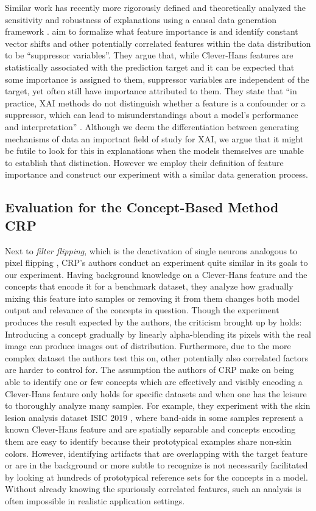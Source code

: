 Similar work has recently more rigorously defined and theoretically analyzed the sensitivity and robustness of explanations using a causal data generation framework \citep{Wilming2023,Wilming2022, Clark2023}. \cite{Wilming2022} aim to formalize what feature importance is and identify constant vector shifts and other potentially correlated features within the data distribution to be ``suppressor variables''.
They argue that, while Clever-Hans features are statistically associated with the prediction target and it can be expected that some importance is assigned to them, suppressor variables are independent of the target, yet often still have importance attributed to them. They state that ``in practice, XAI methods do not distinguish whether a feature is a confounder or a suppressor, which can lead to misunderstandings about a model's performance and interpretation'' \citep{Wilming2023}. Although we deem the differentiation between generating mechanisms of data an important field of study for XAI, we argue that it might be futile to look for this in explanations when the models themselves are unable to establish that distinction. 
However we employ their definition of feature importance and construct our experiment with a similar data generation process.

\subsection{Evaluation for the Concept-Based Method CRP}
Next to \textit{filter flipping}, which is the deactivation of single neurons analogous to pixel flipping \citep{Samek2017a}, CRP's authors conduct an experiment quite similar in its goals to our experiment. 
Having background knowledge on a Clever-Hans feature and the concepts that encode it for a benchmark dataset, they analyze how gradually mixing this feature into samples or removing it from them changes both model output and relevance of the concepts in question. 
Though the experiment produces the result expected by the authors, the criticism brought up by \cite{Hooker2019} holds: Introducing a concept gradually by linearly alpha-blending its pixels with the real image can produce images out of distribution. Furthermore, due to the more complex dataset the authors test this on, other potentially also correlated factors are harder to control for. The assumption the authors of CRP make on being able to identify one or few concepts which are effectively and visibly encoding a Clever-Hans feature only holds for specific datasets and when one has the leisure to thoroughly analyze many samples. For example, they experiment with the skin lesion analysis dataset ISIC 2019 \cite{Codella2018}, where band-aids in some samples represent a known Clever-Hans feature and are spatially separable and concepts encoding them are easy to identify because their prototypical examples share non-skin colors. However, identifying artifacts that are overlapping with the target feature or are in the background or more subtle to recognize is not necessarily facilitated by looking at hundreds of prototypical reference sets for the concepts in a model. Without already knowing the spuriously correlated features, such an analysis is often impossible in realistic application settings. 

